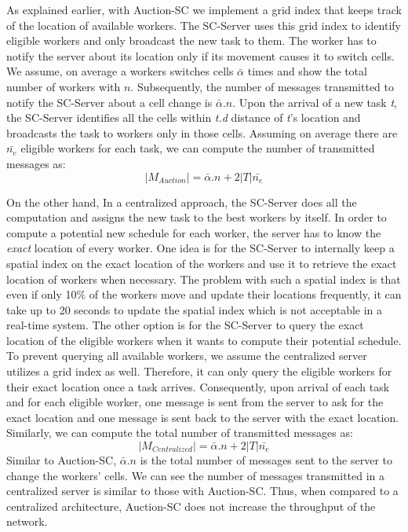 As explained earlier, with Auction-SC we implement a grid index that keeps track of the location of available workers. The SC-Server uses this grid index to identify eligible workers and only broadcast the new task to them. The worker has to notify the server about its location only if its movement causes it to switch cells. We assume, on average a workers switches cells $\bar{\alpha}$ times and show the total number of workers with $n$. Subsequently, the number of messages transmitted to notify the SC-Server about a cell change is $\bar{\alpha}.n$. Upon the arrival of a new task \textit{t}, the SC-Server identifies all the cells within \textit{t.d} distance of \textit{t}'s location and broadcasts the task to workers only in those cells. Assuming on average there are $\bar{n_e}$ eligible workers for each task, we can compute the number of transmitted messages as:
\begin{equation*}
\left| M_{Auction} \right| = \bar{\alpha}.n + 2|T|\bar{n_e}
\end{equation*}

On the other hand, In a centralized approach, the SC-Server does all the computation and assigns the new task to the best workers by itself. In order to compute a potential new schedule for each worker, the server has to know the \textit{exact} location of every worker. One idea is for the SC-Server to internally keep a spatial index on the exact location of the workers and use it to retrieve the exact location of workers when necessary. The problem with such a spatial index is that even if only 10\% of the workers move and update their locations frequently, it can take up to 20 seconds to update the spatial index \cite{Akdogan14} which is not acceptable in a real-time system. The other option is for the SC-Server to query the exact location of the eligible workers when it wants to compute their potential schedule. To prevent querying all available workers, we assume the centralized server utilizes a grid index as well. Therefore, it can only query the eligible workers for their exact location once a task arrives. Consequently, upon arrival of each task and for each eligible worker, one message is sent from the server to ask for the exact location and one message is sent back to the server with the exact location. Similarly, we can compute the total number of transmitted messages as:
\begin{equation*}
\left| M_{Centralized} \right| = \bar{\alpha}.n + 2|T|\bar{n_e}
\end{equation*}
\noindent Similar to Auction-SC, $\bar{\alpha}.n$ is the total number of messages sent to the server to change the workers' cells. We can see the number of messages transmitted in a centralized server is similar to those with Auction-SC. Thus, when compared to a centralized architecture, Auction-SC does not increase the throughput of the network.